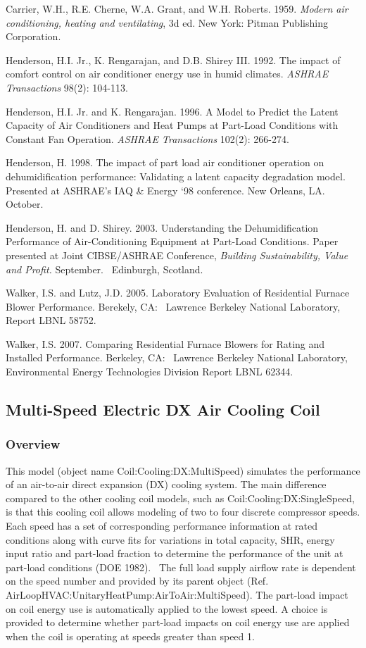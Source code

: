 Carrier, W.H., R.E. Cherne, W.A. Grant, and W.H. Roberts. 1959. \emph{Modern air conditioning, heating and ventilating}, 3d ed. New York: Pitman Publishing Corporation.

Henderson, H.I. Jr., K. Rengarajan, and D.B. Shirey III. 1992. The impact of comfort control on air conditioner energy use in humid climates. \emph{ASHRAE Transactions} 98(2): 104-113.

Henderson, H.I. Jr. and K. Rengarajan. 1996. A Model to Predict the Latent Capacity of Air Conditioners and Heat Pumps at Part-Load Conditions with Constant Fan Operation. \emph{ASHRAE Transactions} 102(2): 266-274.

Henderson, H. 1998. The impact of part load air conditioner operation on dehumidification performance: Validating a latent capacity degradation model. Presented at ASHRAE's IAQ \& Energy `98 conference. New Orleans, LA.~ October.

Henderson, H. and D. Shirey. 2003. Understanding the Dehumidification Performance of Air-Conditioning Equipment at Part-Load Conditions. Paper presented at Joint CIBSE/ASHRAE Conference, \emph{Building Sustainability, Value and Profit.} September.~ Edinburgh, Scotland.

Walker, I.S. and Lutz, J.D. 2005. Laboratory Evaluation of Residential Furnace Blower Performance. Berekely, CA:~ Lawrence Berkeley National Laboratory, Report LBNL 58752.

Walker, I.S. 2007. Comparing Residential Furnace Blowers for Rating and Installed Performance. Berkeley, CA:~ Lawrence Berkeley National Laboratory, Environmental Energy Technologies Division Report LBNL 62344.

\subsection{Multi-Speed Electric DX Air Cooling Coil}\label{multi-speed-electric-dx-air-cooling-coil}

\subsubsection{Overview}\label{overview-2-004}

This model (object name Coil:Cooling:DX:MultiSpeed) simulates the performance of an air-to-air direct expansion (DX) cooling system. The main difference compared to the other cooling coil models, such as Coil:Cooling:DX:SingleSpeed, is that this cooling coil allows modeling of two to four discrete compressor speeds. Each speed has a set of corresponding performance information at rated conditions along with curve fits for variations in total capacity, SHR, energy input ratio and part-load fraction to determine the performance of the unit at part-load conditions (DOE 1982).~ The full load supply airflow rate is dependent on the speed number and provided by its parent object (Ref. AirLoopHVAC:UnitaryHeatPump:AirToAir:MultiSpeed). The part-load impact on coil energy use is automatically applied to the lowest speed. A choice is provided to determine whether part-load impacts on coil energy use are applied when the coil is operating at speeds greater than speed 1.

